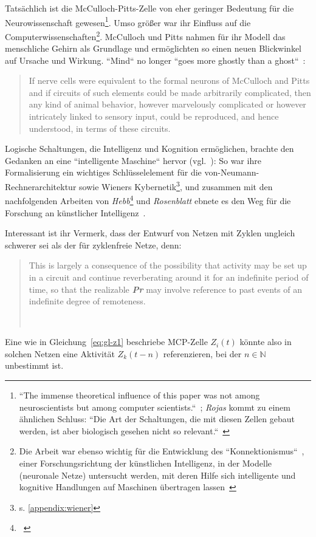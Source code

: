 {Tatsächlich ist die McCulloch-Pitts-Zelle von eher geringer Bedeutung für die Neurowissenschaft gewesen\footnote{
    ``The immense theoretical influence of this paper was not among neuroscientists but among computer scientists.``~\cite[17]{AR88}; \textit{Rojas} kommt zu einem ähnlichen Schluss: ``Die Art der Schaltungen, die mit
    diesen Zellen gebaut werden, ist aber biologisch gesehen nicht so relevant.``~\cite[51]{Roj93}
}.
Umso größer war ihr Einfluss auf die Computerwissenschaften\footnote{
    Die Arbeit war ebenso wichtig für die Entwicklung des ``Konnektionismus``~\cite[11]{Arb19}, einer Forschungsrichtung der künstlichen Intelligenz, in der Modelle (neuronale Netze) untersucht werden, mit deren Hilfe sich intelligente und kognitive Handlungen auf Maschinen übertragen lassen~\cite[v]{Dor91}
}.
McCulloch und Pitts nahmen für ihr Modell das menschliche Gehirn als Grundlage und ermöglichten so einen neuen Blickwinkel auf Ursache und Wirkung. ``Mind`` no longer ``goes more ghostly than a ghost``~\cite[114]{MP43}:

\blockquote[{\cite[9]{Per88}}]{
If nerve cells were equivalent to the formal neurons of McCulloch and Pitts and if circuits of such elements could be made arbitrarily complicated, then any kind of animal behavior, however marvelously complicated or however intricately linked to sensory input, could be reproduced, and hence understood, in terms of these circuits.
}

Logische Schaltungen, die Intelligenz und Kognition ermöglichen, brachte den Gedanken an eine ``intelligente Maschine`` hervor (vgl.~\cite[204]{Pic04}): So war ihre Formalisierung ein wichtiges Schlüsselelement für die von-Neumann-Rechnerarchitektur \cite{Neu93} sowie Wieners Kybernetik\footnote{s. \ref{appendix:wiener}}, und zusammen mit den nachfolgenden Arbeiten von \textit{Hebb}\footnote{~\cite{Heb49}} und \textit{Rosenblatt} ebnete es den Weg für die Forschung an künstlicher Intelligenz~\cite[1]{Arb19}.

\noindent
Interessant ist ihr Vermerk, dass der Entwurf von Netzen mit Zyklen ungleich schwerer sei als der für zyklenfreie Netze, denn:

\blockquote[{~\cite[108, Hervorhebungen i.O.]{MP43}}]{
 This is largely a consequence of the possibility that activity may be set up in a circuit and continue reverberating around it for an indefinite period of time, so that the realizable \textbf{\textit{Pr}} may involve reference to past events of an indefinite degree of remoteness.
}

\noindent
Eine wie in Gleichung~\ref{eq:gl-z1} beschriebe MCP-Zelle $Z_i(t)$ könnte also in solchen Netzen eine Aktivität $Z_k(t-n)$ referenzieren, bei der $n \in \mathbb{N}$ unbestimmt ist.

}
